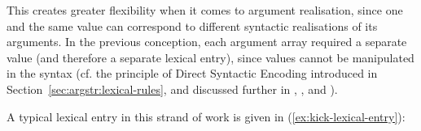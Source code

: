\documentclass[output=paper]{langscibook}
\begin{document}
\ea\label{ex:diff-semantic-forms}
\ea {}
\ex {}
\z
\z
%
This creates greater flexibility when it comes to argument realisation, since
one and the same \PRED value can correspond to different syntactic realisations
of its arguments. In the previous conception, each argument array required a
separate \PRED value (and therefore a separate lexical entry), since \PRED
values cannot be manipulated in the syntax (cf. the principle of Direct
Syntactic Encoding introduced in Section~\ref{sec:argstr:lexical-rules}, and discussed
further in \citealp{kaplanbresnan82}, \citealp[sec.~5.2]{BresnanEtAl2016}, and
\citealp[329]{DLM:LFG}).%

A typical lexical entry in this strand of work is given in
(\ref{ex:kick-lexical-entry}):
\end{document}
